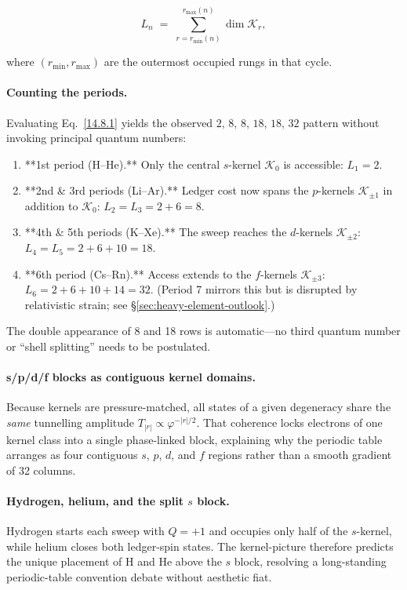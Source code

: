 \documentclass[11pt,oneside]{book}
\begin{document}
\[
L_{n}
\;=\;
\sum_{r=r_{\min}(n)}^{r_{\max}(n)}
\dim\mathcal K_{r},
\tag{14.8.1}
\]

where \((r_{\min},r_{\max})\) are the outermost occupied rungs in that
cycle.

\paragraph*{Counting the periods.}
Evaluating Eq.~\eqref{14.8.1} yields the observed
\(2,\,8,\,8,\,18,\,18,\,32\) pattern without invoking principal
quantum numbers:

\begin{enumerate}[label=(\arabic*)]
\item **1st period (H–He).**  
      Only the central \(s\)-kernel \(\mathcal K_{0}\) is accessible:
      \(L_{1}=2\).

\item **2nd \& 3rd periods (Li–Ar).**  
      Ledger cost now spans the \(p\)-kernels \(\mathcal K_{\pm1}\)
      in addition to \(\mathcal K_{0}\):
      \(L_{2}=L_{3}=2+6=8\).

\item **4th \& 5th periods (K–Xe).**  
      The sweep reaches the \(d\)-kernels \(\mathcal K_{\pm2}\):
      \(L_{4}=L_{5}=2+6+10=18\).

\item **6th period (Cs–Rn).**  
      Access extends to the \(f\)-kernels \(\mathcal K_{\pm3}\):
      \(L_{6}=2+6+10+14=32\).  
      (Period 7 mirrors this but is disrupted by relativistic strain;
      see §\ref{sec:heavy-element-outlook}.)
\end{enumerate}

The double appearance of 8 and 18 rows is automatic—no third quantum
number or “shell splitting” needs to be postulated.

\paragraph*{s/p/d/f blocks as contiguous kernel domains.}
Because kernels are pressure-matched, all states of a given degeneracy
share the \emph{same} tunnelling amplitude
\(T_{|r|}\propto\varphi^{-|r|/2}\).
That coherence locks electrons of one kernel class into a single
phase-linked block, explaining why the periodic table arranges as
four contiguous
\(s\), \(p\), \(d\), and \(f\) regions rather than a smooth gradient
of 32 columns.

\paragraph*{Hydrogen, helium, and the split \(s\) block.}
Hydrogen starts each sweep with \(Q=+1\) and occupies only half of the
\(s\)-kernel, while helium closes both ledger-spin states.  The
kernel-picture therefore predicts the unique placement of H and He
above the \(s\) block, resolving a long-standing periodic-table
convention debate without aesthetic fiat.
\end{document}
